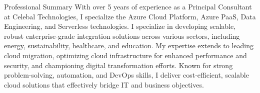 \documentclass{resume} %
\begin{document}
    
    
    
    \begin{rSection}{Professional Summary}
        {With over 5 years of experience as a Principal Consultant at Celebal Technologies, I specialize the Azure Cloud Platform, Azure PaaS, Data Engineering, and Serverless technologies. I specialize in developing scalable, robust enterprise-grade integration solutions across various sectors, including energy, sustainability, healthcare, and education. My expertise extends to leading cloud migration, optimizing cloud infrastructure for enhanced performance and security, and championing digital transformation efforts. Known for strong problem-solving, automation, and DevOps skills, I deliver cost-efficient, scalable cloud solutions that effectively bridge IT and business objectives.}
    \end{rSection}
    
    
\end{document}
